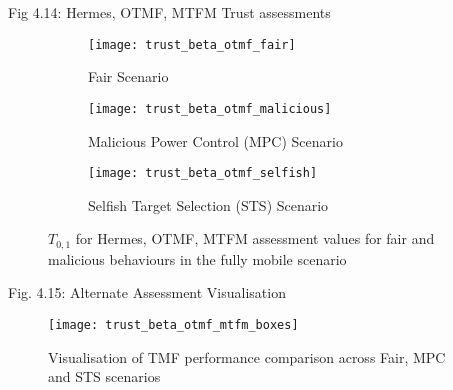 \documentclass[aspectratio=169]{beamer}
\begin{document}
\begin{frame}{Fig 4.14: Hermes, OTMF, MTFM Trust assessments}
	\begin{figure}[t]
		\centering

			\begin{subfigure}{0.3\textwidth}	
				\texttt{[image: trust\_beta\_otmf\_fair]}
				\caption{Fair Scenario}
				\label{fig:all_mobile_fair_beta}
			\end{subfigure}
			\begin{subfigure}{0.3\textwidth}
				\texttt{[image: trust\_beta\_otmf\_malicious]} 
				\caption{Malicious Power Control (MPC) Scenario}
				\label{fig:all_mobile_badmouthing_beta}
			\end{subfigure} 
			\begin{subfigure}{0.3\textwidth}	
				\texttt{[image: trust\_beta\_otmf\_selfish]} 
				\caption{Selfish Target Selection (STS) Scenario}
				\label{fig:all_mobile_selfish_beta}
			\end{subfigure}

		\caption{$T_{0,1}$ for Hermes, OTMF, MTFM assessment values for fair and malicious behaviours in the fully mobile scenario}
		\label{fig:otmf_beta_comparison}
	\end{figure}
\end{frame}
\begin{frame}{Fig. 4.15: Alternate Assessment Visualisation}
	\begin{figure}
		\centering
		\texttt{[image: trust\_beta\_otmf\_mtfm\_boxes]}
		\caption{Visualisation of TMF performance comparison across Fair, MPC and STS scenarios}
		\label{fig:otmf_beta_comparison_boxes}
	\end{figure}
\end{frame}
\end{document}
